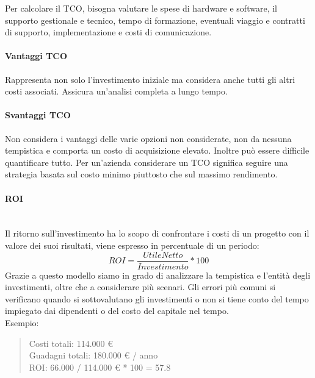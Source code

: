 \documentclass{article}
\begin{document}
		Per calcolare il TCO, bisogna valutare le spese di hardware e software, il supporto gestionale e tecnico, tempo di formazione, eventuali viaggio e contratti di supporto, implementazione e costi di comunicazione.
		
		
		\paragraph{Vantaggi TCO}
		Rappresenta non solo l'investimento iniziale ma considera anche tutti gli altri costi associati. Assicura un'analisi completa a lungo tempo.
		
		\paragraph{Svantaggi TCO}
		Non considera i vantaggi delle varie opzioni non considerate, non da nessuna tempistica e comporta un costo di acquisizione elevato. Inoltre può essere difficile quantificare tutto.
		Per un'azienda considerare un TCO significa seguire una strategia basata sul costo minimo piuttosto che sul massimo rendimento.
		
		\paragraph{ROI}\mbox{}\\
		Il ritorno sull'investimento ha lo scopo di confrontare i costi di un progetto con il valore dei suoi risultati, viene espresso in percentuale di un periodo: $$ ROI =\frac{Utile Netto}{ Investimento} * 100 $$
		Grazie a questo modello siamo in grado di analizzare la tempistica e l'entità degli investimenti, oltre che a considerare più scenari.
		Gli errori più comuni si verificano quando si sottovalutano gli investimenti o non si tiene conto del tempo impiegato dai dipendenti o del costo del capitale nel tempo.\\ 
		
		Esempio:\\
		\begin{quote}
		Costi totali: 114.000 €\\
		Guadagni totali: 180.000 € / anno\\
		ROI: 66.000 / 114.000 € * 100 = 57.8%
		\end{quote}
		
		\newpage
\end{document}
